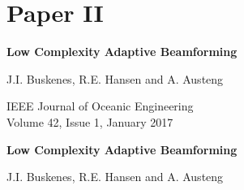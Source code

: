 \ifMonolithic\else\fi


\newif\ifBuildBibliography\BuildBibliographyfalse
\usepackage{subfig}

{}



\ifMonolithic\else
   
\fi




\graphicspath{{../LCAforActiveSonarImaging/submission/final/}}
\ifMonolithic\else\fi
% 
\cleardoublepage
\pagestyle{empty}

{
\setlength\parskip{\baselineskip}
\renewcommand\baselinestretch{1.1}

\chapter{Paper II}

{\Large\bf Low Complexity Adaptive Beamforming}

J.I. Buskenes, R.E. Hansen and A. Austeng

IEEE Journal of Oceanic Engineering\\
Volume 42, Issue 1, January 2017%
}


\cleardoublepage
\pagestyle{normal}
\thispagestyle{plain}

\begin{center}
{\Large\bf Low Complexity Adaptive Beamforming}

\vspace{\baselineskip}
J.I. Buskenes, R.E. Hansen and A. Austeng
\end{center}

\overfullrule=1mm
{

   
}
   
% 
% 
%    


\ifMonolithic\else\fi